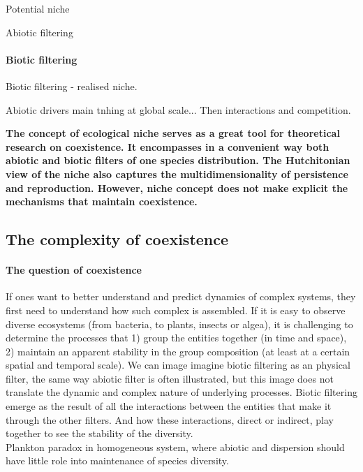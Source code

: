 Potential niche

Abiotic filtering 

\paragraph{Biotic filtering}

Biotic filtering - realised niche.

Abiotic drivers main tnhing at global scale... Then interactions and competition.

\textbf{The concept of ecological niche serves as a great tool for theoretical research on coexistence. It encompasses in a convenient way both abiotic and biotic filters of one species distribution. The Hutchitonian view of the niche also captures the multidimensionality of persistence and reproduction. However, niche concept does not make explicit the mechanisms that maintain coexistence.}


\subsection{The complexity of coexistence}

\paragraph{The question of coexistence}
If ones want to better understand and predict dynamics of complex systems, they first need to understand how such complex is assembled. If it is easy to observe diverse ecosystems (from bacteria, to plants, insects or algea), it is challenging to determine the processes that 1) group the entities together (in time and space), 2) maintain an apparent stability in the group composition (at least at a certain spatial and temporal scale). 
We can image imagine biotic filtering as an physical filter, the same way abiotic filter is often illustrated, but this image does not translate the dynamic and complex nature of underlying processes. Biotic filtering emerge as the result of all the interactions between the entities that make it through the other filters. And how these interactions, direct or indirect, play together to see the stability of the diversity.\\
Plankton paradox in homogeneous system, where abiotic and dispersion should have little role into maintenance of species diversity.\\
																			
